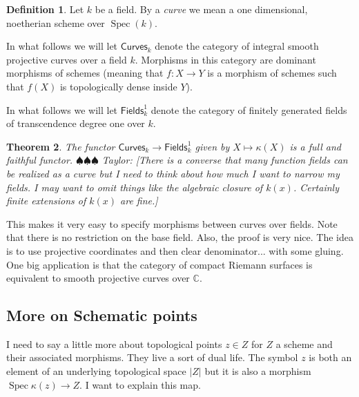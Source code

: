 \documentclass[12pt]{article}
\numberwithin{equation}{section}
\newtheorem{theorem}{Theorem}[subsection]
\theoremstyle{definition}
\newtheorem{definition}[theorem]{Definition}
\theoremstyle{remark}
\newcommand{\CC}{\mathbb{C}}
\newcommand{\Spec}{\operatorname{Spec}}
\newcommand{\Fields}{\mathsf{Fields}}
\newcommand{\Curves}{\mathsf{Curves}}
\newcommand{\taylor}[1]{{\color{blue} \sf $\spadesuit\spadesuit\spadesuit$ Taylor: [#1]}}
\begin{document}
\begin{definition}
	Let $k$ be a field. 
	By a \emph{curve} we mean a one dimensional, noetherian scheme over $\Spec(k)$.
\end{definition}

In what follows we will let $\Curves_k$ denote the category of integral smooth projective curves over a field $k$.
Morphisms in this category are dominant morphisms of schemes (meaning that $f:X\to Y$ is a morphism of schemes such that $f(X)$ is topologically dense inside $Y$).

In what follows we will let $\Fields_k^1$ denote the category of finitely generated fields of transcendence degree one over $k$. 
\begin{theorem}
	The functor $\Curves_k \to \Fields_k^1$ given by $X \mapsto \kappa(X)$ is a full and faithful functor. 
	\taylor{There is a converse that many function fields can be realized as a curve but I need to think about how much I want to narrow my fields. I may want to omit things like the algebraic closure of $k(x)$. Certainly finite extensions of $k(x)$ are fine.}
\end{theorem}
This makes it very easy to specify morphisms between curves over fields. 
Note that there is no restriction on the base field.
Also, the proof is very nice. 
The idea is to use projective coordinates and then clear denominator... with some gluing. 
One big application is that the category of compact Riemann surfaces is equivalent to smooth projective curves over $\CC$. 

\subsection{More on Schematic points}
I need to say a little more about topological points $z\in Z$ for $Z$ a scheme and their associated morphisms. 
They live a sort of dual life. 
The symbol $z$ is both an element of an underlying topological space $\vert Z \vert$ but it is also a morphism $\Spec \kappa(z) \to Z$. 
I want to explain this map.
\end{document}

